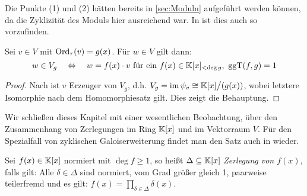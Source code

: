 \begin{bemerkung}
  Die Punkte (1) und (2) hätten bereits in \autoref{sec:Moduln} aufgeführt
  werden können, da die Zyklizität des Moduls hier ausreichend war.
  In \autocite[Theorem 7.10]{hachenberger1997finite} ist dies auch so
  vorzufinden.
\end{bemerkung}

\begin{kor}
  \label{kor:moduln_ueber_v_g}
  Sei $v \in V$ mit $\operatorname{Ord}_\tau(v) = g(x)$.
  Für $w \in V$ gilt dann:
  \[ w \in V_g \quad\Leftrightarrow\quad 
    w = f(x)\cdot v \text{ für ein } f(x) \in \K[x]_{< \deg g},\ \ggT(f,g)=1\]
\end{kor}
\begin{proof}
  Nach  ist $v$ Erzeuger von $V_g$, d.h.
  $V_g = \operatorname{im} \psi_v \cong \mathbb{K}[x]\big/(g(x))$, wobei letztere Isomorphie nach dem
  Homomorphiesatz gilt. Dies zeigt die Behauptung.
\end{proof}


Wir schließen dieses Kapitel mit einer wesentlichen Beobachtung, über den
Zusammenhang von Zerlegungen im Ring $\mathbb{K}[x]$ und im Vektorraum $V$. 
Für den Spezialfall von zyklischen Galoiserweiterung findet man den Satz auch
in \autocite[Theorem 8.6]{hachenberger1997finite} wieder.

\begin{definition}[Zerlegung]
  Sei $f(x)\in \mathbb{K}[x]$ normiert mit $\deg f \geq 1$, so heißt 
  $\Delta \subseteq \mathbb{K}[x]$ \emph{Zerlegung von $f(x)$}, falls gilt: Alle
  $\delta \in \Delta$ sind normiert, vom Grad größer gleich 1, paarweise
  teilerfremd und es gilt: $f(x) = \prod_{\delta\in \Delta} \delta(x)$.
\end{definition}


